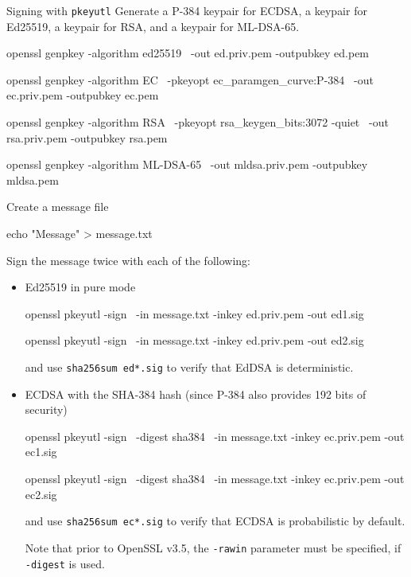 \documentclass{practice}
\begin{document}
\begin{task}{Signing with \texttt{pkeyutl}}
  Generate a P-384 keypair for ECDSA, a keypair for Ed25519, a keypair for RSA, and a keypair for ML-DSA-65.

  \begin{cmdblock}
openssl genpkey -algorithm ed25519 \
  -out ed.priv.pem -outpubkey ed.pem
  \end{cmdblock}
  \begin{cmdblock}
openssl genpkey -algorithm EC \
  -pkeyopt ec_paramgen_curve:P-384 \
  -out ec.priv.pem -outpubkey ec.pem
  \end{cmdblock}
  \begin{cmdblock}
openssl genpkey -algorithm RSA \
  -pkeyopt rsa_keygen_bits:3072 -quiet \
  -out rsa.priv.pem -outpubkey rsa.pem
  \end{cmdblock}
  \begin{cmdblock}
openssl genpkey -algorithm ML-DSA-65 \
  -out mldsa.priv.pem -outpubkey mldsa.pem
  \end{cmdblock}

  Create a message file
  \begin{cmdblock}
echo "Message" > message.txt
  \end{cmdblock}

  Sign the message twice with each of the following:
  \begin{itemize}
    \item Ed25519 in pure mode
    \begin{cmdblock}
openssl pkeyutl -sign \
  -in message.txt -inkey ed.priv.pem -out ed1.sig

openssl pkeyutl -sign \
  -in message.txt -inkey ed.priv.pem -out ed2.sig
    \end{cmdblock}
    and use \texttt{sha256sum ed*.sig} to verify that EdDSA is deterministic.

    \item ECDSA with the SHA-384 hash (since P-384 also provides 192 bits of security)
    \begin{cmdblock}
openssl pkeyutl -sign \
  -digest sha384 \
  -in message.txt -inkey ec.priv.pem -out ec1.sig

openssl pkeyutl -sign \
  -digest sha384 \
  -in message.txt -inkey ec.priv.pem -out ec2.sig
    \end{cmdblock}
    and use \texttt{sha256sum ec*.sig} to verify that ECDSA is probabilistic by default.

    Note that prior to OpenSSL v3.5, the \texttt{-rawin} parameter must be specified, if \texttt{-digest} is used.


\end{itemize}
\end{task}
\end{document}

